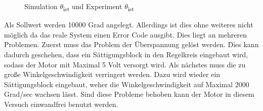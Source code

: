 \documentclass[10pt]{scrartcl}
\begin{document}
\begin{figure} [H]
\caption{ Simulation $\theta$\textsubscript{ist} und Experiment $\theta$\textsubscript{ist}  } 
\end{figure}
Als Sollwert werden 10000 Grad angelegt.
Allerdings ist dies ohne weiteres nicht möglich da das reale System einen Error Code ausgibt. 
Dies liegt an mehreren Problemen.
Zuerst muss das Problem der Überspannung gelöst werden. Dies kann dadurch geschehen, dass ein Sättigungsblock in den Regelkreis eingebaut wird, sodass der Motor mit Maximal 5 Volt versorgt wird. Als nächstes muss die zu große Winkelgeschwindigkeit verringert werden. Dazu wird wieder ein Sättigungsblock eingebaut, weher die Winkelgeschwindigkeit auf Maximal 2000 Grad/sec wachsen lässt. Sind diese Probleme behoben kann der Motor in diesem Versuch einwandfrei benutzt werden.
\newpage
\end{document}
